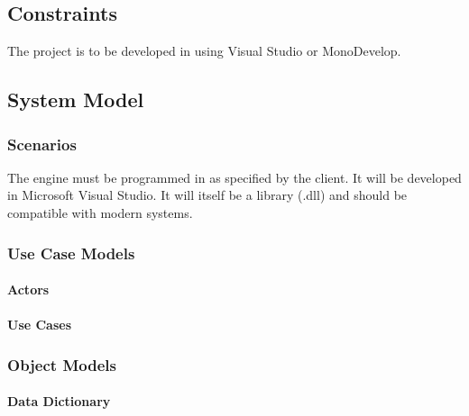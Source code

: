 \begin{enumerate}
\subsection{Constraints}
The project is to be developed in \csharp using Visual Studio or MonoDevelop.

\subsection{System Model}


\subsubsection{Scenarios}
The engine must be programmed in \csharp as specified by the client. It will be developed in Microsoft Visual Studio. It will itself be a library (.dll) and should be compatible with modern systems.

\subsubsection{Use Case Models}
\paragraph{Actors}
\paragraph{Use Cases}

\subsubsection{Object Models}
\paragraph{Data Dictionary}

\end{enumerate}

